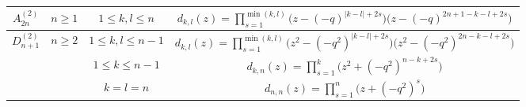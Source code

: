 \documentclass[11pt, leqno]{amsart}
\theoremstyle{definition}
\numberwithin{equation}{section}
\begin{document}
\begin{center}
\begin{tabular}{ | c | c | c | c  | }
$A_{2n}^{(2)}$& $n \ge 1$ & $1 \le k,l \le n$ & $d_{k,l}(z) = \displaystyle \prod_{s=1}^{\min(k,l)} \big(z-(-q)^{|k-l|+2s}\big)\big(z-(-q)^{2n+1-k-l+2s}\big)$ \\ \hline
$D_{n+1}^{(2)}$& $n \ge 2$ & $1 \le k,l \le n-1$ &  $d_{k,l}(z) = \displaystyle \prod_{s=1}^{\min(k,l)} \big(z^2 - {(-q^2)}^{|k-l|+2s}\big)\big(z^2 - {(-q^2)}^{2n-k-l+2s}\big)$ \\ \cline {3-4}
               & & $1 \le k \le n-1$ & $d_{k,n}(z) = \displaystyle \prod_{s=1}^{k}\big(z^2+(-q^{2})^{n-k+2s}\big)$ \\ \cline {3-4}
               & & $k=l=n$ & $ d_{n,n}(z)=\displaystyle \prod_{s=1}^{n} \big(z+{(-q^2)}^{s}\big)$ \\ \hline
\end{tabular}
\end{center}
\end{document}
